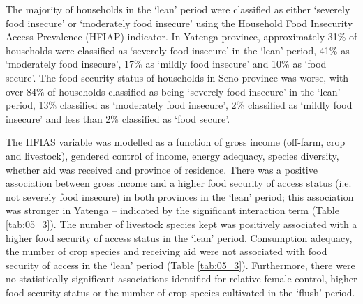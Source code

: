 The majority of households in the `lean' period were classified as either `severely food insecure' or `moderately food insecure' using the Household Food Insecurity Access Prevalence (HFIAP) indicator. In Yatenga province, approximately 31\% of households were classified as `severely food insecure' in the `lean' period, 41\% as `moderately food insecure', 17\% as `mildly food insecure' and 10\% as `food secure'. The food security status of households in Seno province was worse, with over 84\% of households classified as being `severely food insecure' in the `lean' period, 13\% classified as `moderately food insecure', 2\% classified as `mildly food insecure' and less than 2\% classified as `food secure'.

The HFIAS variable was modelled as a function of gross income (off-farm, crop and livestock), gendered control of income, energy adequacy, species diversity, whether aid was received and province of residence. There was a positive association between gross income and a higher food security of access status (i.e. not severely food insecure) in both provinces in the `lean' period; this association was stronger in Yatenga -- indicated by the significant interaction term (Table \ref{tab:05_3}). The number of livestock species kept was positively associated with a higher food security of access status in the `lean' period. Consumption adequacy, the number of crop species and receiving aid were not associated with food security of access in the `lean' period (Table \ref{tab:05_3}). Furthermore, there were no statistically significant associations identified for relative female control, higher food security status or the number of crop species cultivated in the `flush' period.



